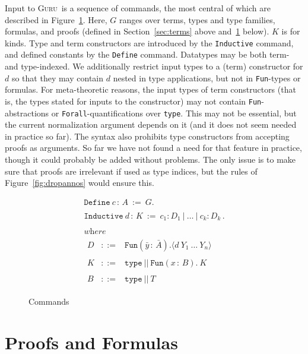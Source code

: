 \documentclass[9pt,natbib]{sigplanconf}
\newcommand{\guru}[0]{\textsc{Guru}}
\begin{document}
Input to \guru\ is a sequence of commands, the most central of which
are described in Figure~\ref{fig:command}.  Here, $G$ ranges over
terms, types and type families, formulas, and proofs (defined in
Section~\ref{sec:terms} above and~\ref{sec:pfs} below).  $K$ is for
kinds.  Type and term constructors are introduced by the
\texttt{Inductive} command, and defined constants by the
\texttt{Define} command.  Datatypes may be both term- and
type-indexed.  We additionally restrict input types to a (term)
constructor for $d$ so that they may contain $d$ nested in type
applications, but not in \texttt{Fun}-types or formulas.  For
meta-theoretic reasons, the input types of term constructors (that is,
the types stated for inputs to the constructor) may not contain
\texttt{Fun}-abstractions or \texttt{Forall}-quantifications over
\texttt{type}.  This may not be essential, but the current
normalization argument depends on it (and it does not seem needed in
practice so far).  The syntax also prohibits type constructors from
accepting proofs as arguments.  So far we have not found a need for
that feature in practice, though it could probably be added without
problems.  The only issue is to make sure that proofs are irrelevant
if used as type indices, but the rules of Figure~\ref{fig:dropannos}
would ensure this.

\begin{figure}
\[
\begin{array}{l} 
\texttt{Define}\ c\, :\, A\ :=\ G. \\ \\
\texttt{Inductive}\ d\, :\, K \ := \ c_1 : D_1\ |\ \ldots\ |\ c_k : D_k\, .
\\ \\ 
\textit{where}\\
\begin{array}{lll}
D & ::= & \texttt{Fun}(\bar{y}\,:\,\bar{A}) . \langle  d\ Y_1\ \ldots\ Y_n\rangle
\\
\\
K & ::= & \texttt{type}\ ||\ \texttt{Fun}(x\,:\,B).\ K
\\
\\ 
B & ::= & \texttt{type}\ ||\ T
\end{array}
\end{array}
\]
\caption{\label{fig:command}Commands}
\end{figure}

\section{Proofs and Formulas}
\label{sec:pfs}
\end{document}
